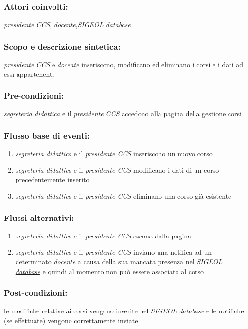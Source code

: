 \documentclass[11pt,a4paper]{article}
\begin{document}
\subsubsection*{Attori coinvolti:}
\textit{presidente CCS}, \textit{docente},\textit{SIGEOL \underline{database}}
\subsubsection*{Scopo e descrizione sintetica:}
\textit{presidente CCS} e \textit{docente} inseriscono, modificano ed eliminano i corsi e i dati ad essi appartenenti
\subsubsection*{Pre-condizioni:}
\textit{segreteria didattica} e il \textit{presidente CCS} accedono alla pagina della gestione corsi
\subsubsection*{Flusso base di eventi:}
\begin{enumerate}
 \item \textit{segreteria didattica} e il \textit{presidente CCS} inseriscono un nuovo corso 
 \item \textit{segreteria didattica} e il \textit{presidente CCS} modificano i dati di un corso precedentemente inserito
 \item \textit{segreteria didattica} e il \textit{presidente CCS} eliminano una corso già esistente
\end{enumerate}
\subsubsection*{Flussi alternativi:}
\begin{enumerate} 
\item \textit{segreteria didattica} e il \textit{presidente CCS} escono dalla pagina
\item \textit{segreteria didattica} e il \textit{presidente CCS} inviano una notifica ad un determinato \textit{docente} a causa della sua mancata presenza nel \textit{SIGEOL \underline{database}} e quindi al momento non può essere associato al corso
\end{enumerate}
\subsubsection*{Post-condizioni:}
le modifiche relative ai corsi vengono inserite nel \textit{SIGEOL \underline{database}} e le notifiche (se effettuate) vengono correttamente 
inviate
\end{document}
